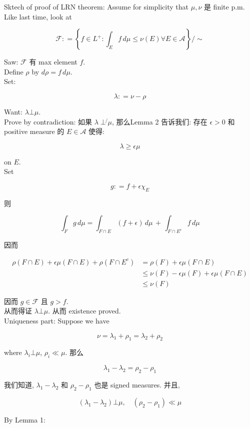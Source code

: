 \documentclass{qlnotes-export}
\begin{document}
Sktech of proof of LRN theorem: Assume for simplicity that \(\mu,\nu\) 是 finite p.m.\\
Like last time, look at

\[\mathcal{F}: = \left\{ {f \in L^{+}:\int_{E}f\, d\mu \leq \nu(E)\forall E \in \mathcal{A}} \right\}/ \sim\]

Saw: \(\mathcal{F}\) 有 max element \(f\).\\
Define \(\rho\) by \(d\rho = f\, d\mu\).\\
Set:

\[\lambda: = \nu - \rho\]

Want: \(\lambda\bot\mu\).\\
Prove by contradiction: 如果 \(\lambda\operatorname{\perp\not{}}\mu\), 那么Lemma 2 告诉我们: 存在 \(\epsilon > 0\) 和 positive measure 的 \(E \in \mathcal{A}\) 使得:

\[\lambda \geq \epsilon\mu\]

on \(E\).\\
Set

\[g: = f + \epsilon\chi_{E}\]

则

\[\int_{F}g\, d\mu = \int_{F \cap E}(f + \epsilon)\, d\mu\, + \,\int_{F \cap E^{c}}f\, d\mu\]

因而

\[\begin{matrix}
{\rho(F \cap E) + \epsilon\mu(F \cap E) + \rho(F \cap E^{c})} & {= \rho(F) + \epsilon\mu(F \cap E)} \\
 & {\leq \nu(F) - \epsilon\mu(F) + \epsilon\mu(F \cap E)} \\
 & {\leq \nu(F)}
\end{matrix}\]

因而 \(g \in \mathcal{F}\) 且 \(g > f\).\\
从而得证 \(\lambda\bot\mu\). 从而 existence proved.\\
Uniqueness part: Suppose we have

\[\nu = \lambda_{1} + \rho_{1} = \lambda_{2} + \rho_{2}\]

where \(\lambda_{i}\bot\mu\), \(\rho_{i} \ll \mu\). 那么

\[\lambda_{1} - \lambda_{2} = \rho_{2} - \rho_{1}\]

我们知道, \(\lambda_{1} - \lambda_{2}\) 和 \(\rho_{2} - \rho_{1}\) 也是 signed measures. 并且,

\[(\lambda_{1} - \lambda_{2})\bot\mu,\quad(\rho_{2} - \rho_{1}) \ll \mu\]

By Lemma 1:
\end{document}
